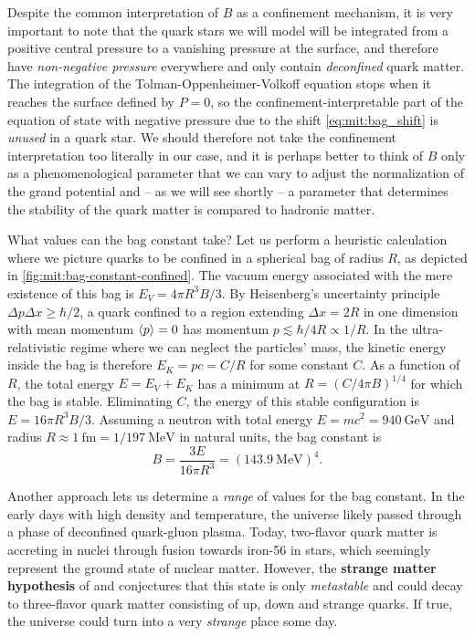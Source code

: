 Despite the common interpretation of $B$ as a confinement mechanism,
it is very important to note that the quark stars we will model 
will be integrated from a positive central pressure to a vanishing pressure at the surface,
and therefore have \emph{non-negative pressure} everywhere and only contain \emph{deconfined} quark matter.
The integration of the Tolman-Oppenheimer-Volkoff equation stops when it reaches the surface defined by $P=0$,
so the confinement-interpretable part of the equation of state with negative pressure due to the shift \eqref{eq:mit:bag_shift} is \emph{unused} in a quark star.
We should therefore not take the confinement interpretation too literally in our case,
and it is perhaps better to think of $B$ only as a phenomenological parameter that we can vary to adjust the normalization of the grand potential
and -- as we will see shortly -- a parameter that determines 
the stability of the quark matter is compared to hadronic matter.

What values can the bag constant take?
Let us perform a heuristic calculation where we picture quarks to be confined in a spherical bag of radius $R$, as depicted in \cref{fig:mit:bag-constant-confined}.
The vacuum energy associated with the mere existence of this bag is $E_V = 4 \pi R^3 B / 3$.
By Heisenberg's uncertainty principle $\Delta p \Delta x \geq \hbar/2$, a quark confined to a region extending $\Delta x = 2R$ in one dimension with mean momentum $\langle p \rangle = 0$ has momentum $p \lesssim \hbar/4R \propto 1/R$.
In the ultra-relativistic regime where we can neglect the particles' mass, the kinetic energy inside the bag is therefore $E_K = pc = C / R$ for some constant $C$.
As a function of $R$, the total energy $E = E_V + E_K$ has a minimum at $R = (C/4 \pi B)^{1/4}$ for which the bag is stable.
Eliminating $C$, the energy of this stable configuration is $E = 16 \pi R^3 B / 3$.
Assuming a neutron with total energy $E = m c^2 = \SI{940}{\giga\electronvolt}$ and radius $R \approx \SI{1}{\femto\meter} = 1 / \SI{197}{\mega\electronvolt}$ in natural units,
the bag constant is
\begin{equation}
	B = \frac{3 E}{16 \pi R^3} = (\SI{143.9}{\mega\electronvolt})^4.
\label{eq:mit:bag_constant_optimal}
\end{equation}

Another approach lets us determine a \emph{range} of values for the bag constant.
In the early days with high density and temperature, the universe likely passed through a phase of deconfined quark-gluon plasma. \cite{ref:glendenning}
Today, two-flavor quark matter is accreting in nuclei through fusion towards iron-56 in stars, which seemingly represent the ground state of nuclear matter.
However, the \textbf{strange matter hypothesis} of \cite{ref:strange_hypothesis_bodmer} and \cite{ref:strange_hypothesis_witten} conjectures that this state is only \emph{metastable}
and could decay to three-flavor quark matter consisting of up, down and strange quarks.
If true, the universe could turn into a very \emph{strange} place some day.

